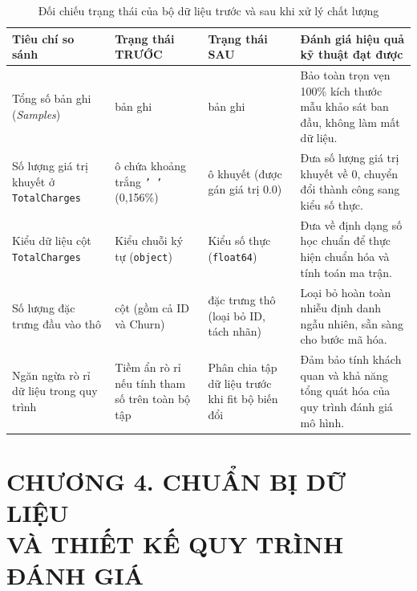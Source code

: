 \documentclass[a4paper]{article}
\renewcommand{\arraystretch}{1.25} %
\begin{document}
{\begin{table}[H]
\vspace{-4pt}
\centering
\caption{Đối chiếu trạng thái của bộ dữ liệu trước và sau khi xử lý chất lượng}
\label{tab:doi_chieu_xuly}
\small
\setlength{\tabcolsep}{3.5pt}
\renewcommand{\arraystretch}{0.98}
\begin{tabularx}{\textwidth}{| >{\raggedright\arraybackslash}p{3.2cm} | >{\raggedright\arraybackslash}p{3.2cm} | >{\raggedright\arraybackslash}p{3.2cm} | >{\raggedright\arraybackslash}X |}
\hline
\textbf{Tiêu chí so sánh} & \textbf{Trạng thái TRƯỚC} & \textbf{Trạng thái SAU} & \textbf{Đánh giá hiệu quả kỹ thuật đạt được} \\
\hline
Tổng số bản ghi (\textit{Samples}) & 7.043 bản ghi & 7.043 bản ghi & Bảo toàn trọn vẹn 100\% kích thước mẫu khảo sát ban đầu, không làm mất dữ liệu. \\
\hline
Số lượng giá trị khuyết ở \texttt{TotalCharges} & 11 ô chứa khoảng trắng \texttt{' '} (0,156\%) & 0 ô khuyết (được gán giá trị 0.0) & Đưa số lượng giá trị khuyết về 0, chuyển đổi thành công sang kiểu số thực. \\
\hline
Kiểu dữ liệu cột \texttt{TotalCharges} & Kiểu chuỗi ký tự (\texttt{object}) & Kiểu số thực (\texttt{float64}) & Đưa về định dạng số học chuẩn để thực hiện chuẩn hóa và tính toán ma trận. \\
\hline
Số lượng đặc trưng đầu vào thô & 21 cột (gồm cả ID và Churn) & 19 đặc trưng thô (loại bỏ ID, tách nhãn) & Loại bỏ hoàn toàn nhiễu định danh ngẫu nhiên, sẵn sàng cho bước mã hóa. \\
\hline
Ngăn ngừa rò rỉ dữ liệu trong quy trình & Tiềm ẩn rò rỉ nếu tính tham số trên toàn bộ tập & Phân chia tập dữ liệu trước khi fit bộ biến đổi & Đảm bảo tính khách quan và khả năng tổng quát hóa của quy trình đánh giá mô hình. \\
\hline
\end{tabularx}
\end{table}

\vspace{1.5em}
\section[CHƯƠNG 4. CHUẨN BỊ DỮ LIỆU VÀ THIẾT KẾ QUY TRÌNH ĐÁNH GIÁ]{CHƯƠNG 4. CHUẨN BỊ DỮ LIỆU\\VÀ THIẾT KẾ QUY TRÌNH ĐÁNH GIÁ}

}
\end{document}
